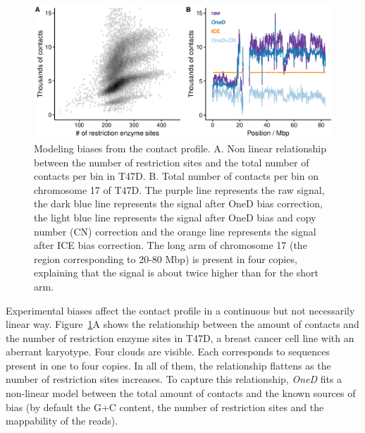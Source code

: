 \documentclass[a4,center,fleqn]{NAR}
\providecommand{\DIFadd}[1]{{\protect\color{red}#1}} %
\providecommand{\DIFdel}[1]{{\protect}}                      %
\providecommand{\DIFaddbegin}{} %
\providecommand{\DIFaddend}{} %
\providecommand{\DIFdelbegin}{} %
\providecommand{\DIFdelend}{} %
\providecommand{\DIFaddFL}[1]{\DIFadd{#1}} %
\providecommand{\DIFdelFL}[1]{\DIFdel{#1}} %
\providecommand{\DIFaddbeginFL}{} %
\providecommand{\DIFaddendFL}{} %
\providecommand{\DIFdelbeginFL}{} %
\providecommand{\DIFdelendFL}{} %
\begin{document}
\begin{figure}
\centerline{\includegraphics[width=.49\textwidth]{figure_1.eps}}
\caption{\DIFdelbeginFL \DIFdelFL{Total amount of contacts per bin}\DIFdelendFL \DIFaddbeginFL \DIFaddFL{Modeling biases from the contact profile}\DIFaddendFL . A. Non linear
relationship between the number of restriction sites and the total number
of contacts per bin in T47D. B. Total number of contacts per bin on
chromosome 17 of T47D. The \DIFdelbeginFL \DIFdelFL{brown }\DIFdelendFL \DIFaddbeginFL \DIFaddFL{purple }\DIFaddendFL line represents the raw signal, the \DIFaddbeginFL \DIFaddFL{dark }\DIFaddendFL blue
line represents the signal after \DIFaddbeginFL \DIFaddFL{OneD }\DIFaddendFL bias correction, the \DIFdelbeginFL \DIFdelFL{black }\DIFdelendFL \DIFaddbeginFL \DIFaddFL{light blue }\DIFaddendFL line
represents the signal after \DIFaddbeginFL \DIFaddFL{OneD }\DIFaddendFL bias and copy number (CN) correction \DIFaddbeginFL \DIFaddFL{and
the orange line represents the signal after ICE bias correction}\DIFaddendFL . The long arm
of chromosome 17 (the region corresponding to 20-80 Mbp) is present in
four copies, explaining that the signal is about twice higher than for
the short arm.}
\label{fig:totals}
\end{figure}


Experimental biases affect the \DIFdelbegin \DIFdel{total amount of contacts }\DIFdelend \DIFaddbegin \DIFadd{contact profile }\DIFaddend in a continuous but not
necessarily linear way. Figure~\ref{fig:totals}A shows the relationship
between the amount of contacts and the number of restriction enzyme sites
in T47D, a breast cancer cell line with an aberrant karyotype.  Four
clouds are visible. Each corresponds to sequences present in one to four
copies. In all of them, the relationship flattens as the number of
restriction sites increases. To capture this relationship, \textit{OneD}
fits a non-linear model between the total amount of contacts and the known
sources of bias (by default the G+C content, the number of restriction
sites and the mappability of the reads).
\end{document}
